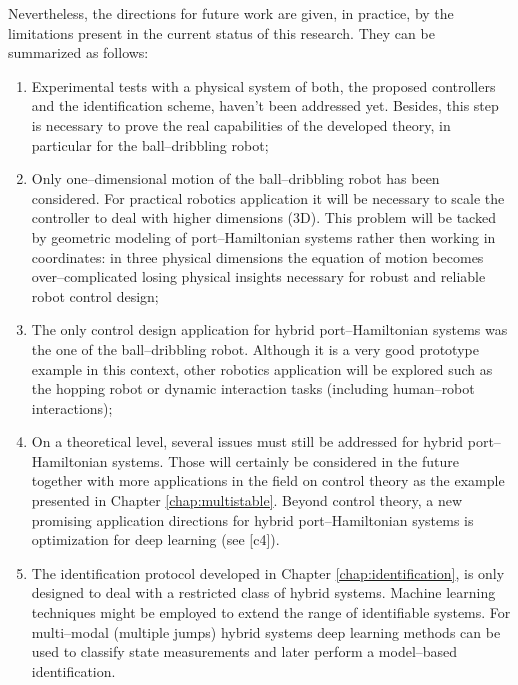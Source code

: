 %
Nevertheless, the directions for future work are given, in practice, by the limitations present in the current status of this research. They can be summarized as follows:
%
\begin{enumerate}
	\item Experimental tests with a physical system of both, the proposed controllers and
	the identification scheme, haven't been addressed yet. Besides, this step is necessary to prove the real capabilities of the developed theory, in particular for the ball--dribbling robot;\\
	\item Only one--dimensional motion of the ball--dribbling robot has been considered. For practical robotics application it will be necessary to scale the controller to deal with higher dimensions (3D). This problem will be tacked by geometric modeling of port--Hamiltonian systems rather then working in coordinates: in three physical dimensions the equation of motion becomes over--complicated losing physical insights necessary for robust and reliable robot control design;\\
	\item The only control design application for hybrid port--Hamiltonian systems was the one of the ball--dribbling robot. Although it is a very good prototype example in this context, other robotics application will be explored such as the hopping robot or dynamic interaction tasks (including human--robot interactions);\\
	\item On a theoretical level, several issues must still be addressed for hybrid port--Hamiltonian systems. Those will certainly be considered in the future together with more applications in the field on control theory as the example presented in Chapter \ref{chap:multistable}. Beyond control theory, a new promising application directions for hybrid port--Hamiltonian systems is optimization for deep learning (see [c4]).\\
	\item The identification protocol developed in Chapter \ref{chap:identification}, is only designed to deal with a restricted class of hybrid systems. Machine learning techniques might be employed to extend the range of identifiable systems. For multi--modal (multiple jumps) hybrid systems deep learning methods can be used to classify state measurements and later perform a model--based identification.  

\end{enumerate}
%